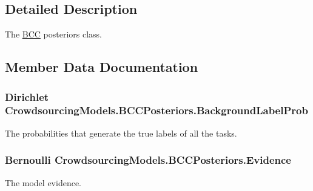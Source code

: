 \subsection{Detailed Description}
The \hyperlink{class_crowdsourcing_models_1_1_b_c_c}{B\+C\+C} posteriors class. 



\subsection{Member Data Documentation}
\hypertarget{class_crowdsourcing_models_1_1_b_c_c_posteriors_aaac52193d90fcc91d50472ddf6683eab}{}
\subsubsection[{Background\+Label\+Prob}]{\setlength{\rightskip}{0pt plus 5cm}Dirichlet Crowdsourcing\+Models.\+B\+C\+C\+Posteriors.\+Background\+Label\+Prob}\label{class_crowdsourcing_models_1_1_b_c_c_posteriors_aaac52193d90fcc91d50472ddf6683eab}


The probabilities that generate the true labels of all the tasks. 

\hypertarget{class_crowdsourcing_models_1_1_b_c_c_posteriors_a9b35421059e1ce53b9eadccfe4d559bf}{}
\subsubsection[{Evidence}]{\setlength{\rightskip}{0pt plus 5cm}Bernoulli Crowdsourcing\+Models.\+B\+C\+C\+Posteriors.\+Evidence}\label{class_crowdsourcing_models_1_1_b_c_c_posteriors_a9b35421059e1ce53b9eadccfe4d559bf}


The model evidence. 

\hypertarget{class_crowdsourcing_models_1_1_b_c_c_posteriors_ab5020db40be02d3dedd50d61371e84c8}{}
